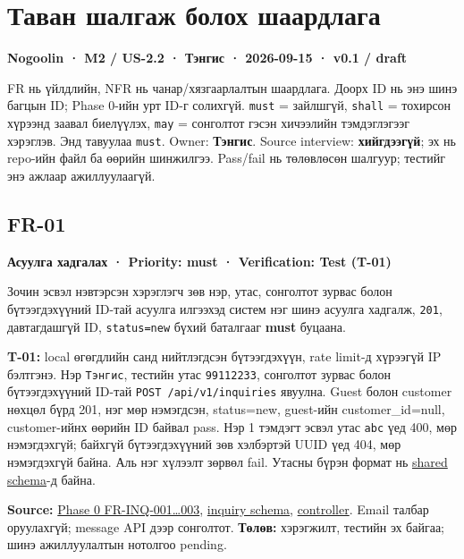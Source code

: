\section{Таван шалгаж болох
шаардлага}\label{doc4-ux442ux430ux432ux430ux43d-ux448ux430ux43bux433ux430ux436-ux431ux43eux43bux43eux445-ux448ux430ux430ux440ux434ux43bux430ux433ux430}

\textbf{Nogoolin · M2 / US-2.2 · Тэнгис · 2026-09-15 · v0.1 / draft}

FR нь үйлдлийн, NFR нь чанар/хязгаарлалтын шаардлага. Доорх ID нь энэ
шинэ багцын ID; Phase 0-ийн урт ID-г солихгүй. \nolinkurl{must} =
зайлшгүй, \nolinkurl{shall} = тохирсон хүрээнд заавал биелүүлэх,
\nolinkurl{may} = сонголтот гэсэн хичээлийн тэмдэглэгээг хэрэглэв. Энд
тавуулаа \nolinkurl{must}. Owner: \textbf{Тэнгис}. Source interview:
\textbf{хийгдээгүй}; эх нь repo-ийн файл ба өөрийн шинжилгээ. Pass/fail
нь төлөвлөсөн шалгуур; тестийг энэ ажлаар ажиллуулаагүй.

\subsection{FR-01}\label{doc4-fr-01}

\textbf{Асуулга хадгалах · Priority: must · Verification: Test (T-01)}

Зочин эсвэл нэвтэрсэн хэрэглэгч зөв нэр, утас, сонголтот зурвас болон
бүтээгдэхүүний ID-тай асуулга илгээхэд систем нэг шинэ асуулга хадгалж,
\nolinkurl{201}, давтагдашгүй ID, \nolinkurl{status=new} бүхий баталгааг
\textbf{must} буцаана.

\textbf{T-01:} local өгөгдлийн санд нийтлэгдсэн бүтээгдэхүүн, rate
limit-д хүрээгүй IP бэлтгэнэ. Нэр \nolinkurl{Тэнгис}, тестийн утас
\nolinkurl{99112233}, сонголтот зурвас болон бүтээгдэхүүний ID-тай
\nolinkurl{POST /api/v1/inquiries} явуулна. Guest болон customer нөхцөл
бүрд 201, нэг мөр нэмэгдсэн, status=new, guest-ийн customer\_id=null,
customer-ийнх өөрийн ID байвал pass. Нэр 1 тэмдэгт эсвэл утас
\nolinkurl{abc} үед 400, мөр нэмэгдэхгүй; байхгүй бүтээгдэхүүний зөв
хэлбэртэй UUID үед 404, мөр нэмэгдэхгүй байна. Аль нэг хүлээлт зөрвөл
fail. Утасны бүрэн формат нь
\href{../../../packages/validation-schemas/src/common.ts}{shared
schema}-д байна.

\textbf{Source:} \href{../../phase-0/02-requirements.md}{Phase 0
FR-INQ-001\ldots003},
\href{../../../packages/validation-schemas/src/inquiry.schema.ts}{inquiry
schema},
\href{../../../backend/api/src/controllers/inquiry.controller.ts}{controller}.
Email талбар оруулахгүй; message API дээр сонголтот. \textbf{Төлөв:}
хэрэгжилт, тестийн эх байгаа; шинэ ажиллуулалтын нотолгоо pending.

